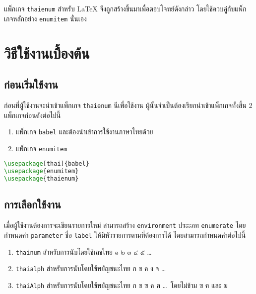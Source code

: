 \documentclass[11pt]{ltxguide}
\begin{document}
แพ็ก{\wbr}เก{\wbr}จ \textlatin{\texttt{thaienum}} สำหรับ \textlatin{\textrm\LaTeX} จึง{\wbr}ถูก{\wbr}สร้าง{\wbr}ขึ้น{\wbr}มา{\wbr}เพื่อ{\wbr}ตอบ{\wbr}โจทย์{\wbr}ดัง{\wbr}กล่าว โดย{\wbr}ใช้{\wbr}ควบคู่{\wbr}กับ{\wbr}แพ็ก{\wbr}เก{\wbr}จ{\wbr}หลัก{\wbr}อย่าง \texttt{enumitem} นั่นเอง{\wbr}


\section{วิธี{\wbr}ใช้งาน{\wbr}เบื้องต้น}

\subsection{ก่อน{\wbr}เริ่ม{\wbr}ใช้งาน}

ก่อน{\wbr}ที่{\wbr}ผู้{\wbr}ใช้งาน{\wbr}จะ{\wbr}นำ{\wbr}เข้า{\wbr}แพ็ก{\wbr}เก{\wbr}จ \texttt{thaienum} นีเพื่อ{\wbr}ใช้งาน ผู้{\wbr}นั้น{\wbr}จำเป็น{\wbr}ต้อง{\wbr}เรียก{\wbr}นำ{\wbr}เข้า{\wbr}แพ็ก{\wbr}เก{\wbr}จ{\wbr}ทั้งสิ้น 2 แพ็ก{\wbr}เก{\wbr}จ{\wbr}ก่อน{\wbr}ดัง{\wbr}ต่อ{\wbr}ไป{\wbr}นี้{\wbr}
\begin{enumerate}[topsep=0.25pc,itemsep=0pc,label={\thainum*.}]
    \item  แพ็ก{\wbr}เก{\wbr}จ \texttt{babel} และ{\wbr}ต้อง{\wbr}นำ{\wbr}เข้า{\wbr}การ{\wbr}ใช้งาน{\wbr}ภาษา{\wbr}ไทย{\wbr}ด้วย{\wbr}
    \item  แพ็ก{\wbr}เก{\wbr}จ \texttt{enumitem}
\end{enumerate}

\begin{lstlisting}[language=LaTeX]
\usepackage[thai]{babel}
\usepackage{enumitem}
\usepackage{thaienum}
\end{lstlisting}

\subsection{การ{\wbr}เลือก{\wbr}ใช้งาน}

เมื่อ{\wbr}ผู้{\wbr}ใช้งาน{\wbr}ต้องการ{\wbr}จะ{\wbr}เขียน{\wbr}รายการ{\wbr}ใหม่ สามารถ{\wbr}สร้าง \texttt{environment} ประะภท \texttt{enumerate} โดย{\wbr}กำหนด{\wbr}ค่า \texttt{parameter} ชื่อ \texttt{label} ให้{\wbr}มี{\wbr}หัว{\wbr}รายการ{\wbr}ตาม{\wbr}ที่{\wbr}ต้องการ{\wbr}ได้ โดย{\wbr}สามารถ{\wbr}กำหนด{\wbr}ค่า{\wbr}ต่อ{\wbr}ไป{\wbr}นี้{\wbr}

\begin{enumerate}[topsep=0.25pc,itemsep=0pc,label={\thainum*.}]
    \item  \texttt{thainum} สำหรับ{\wbr}การ{\wbr}นับ{\wbr}โดย{\wbr}ใช้{\wbr}เลข{\wbr}ไทย ๑ ๒ ๓ ๔ ๕ \ldots
    \item  \label{it:loalph} \texttt{thaialph} สำหรับ{\wbr}การ{\wbr}นับ{\wbr}โดย{\wbr}ใช้{\wbr}พยัญชนะ{\wbr}ไทย ก ข ค ง จ \ldots
    \item  \label{it:hialph} \texttt{thaiAlph} สำหรับ{\wbr}การ{\wbr}นับ{\wbr}โดย{\wbr}ใช้{\wbr}พยัญชนะ{\wbr}ไทย ก ข ฃ ค ฅ \ldots\, โดย{\wbr}ไม่{\wbr}ข้าม ฃ ฅ และ ฆ{\wbr}
\end{enumerate}
\end{document}
